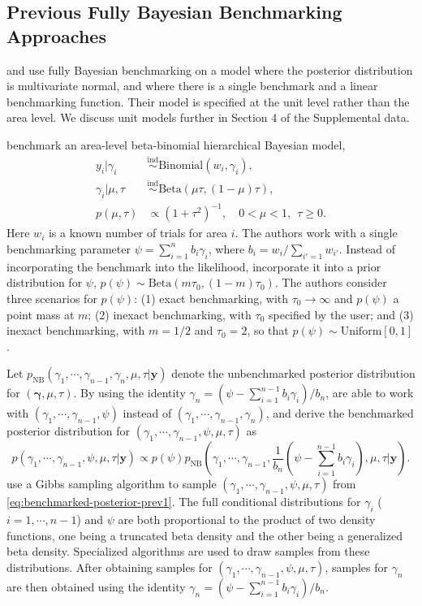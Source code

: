\documentclass[12pt]{article}
\newcommand{\ind}{\stackrel{\text{ind}}{\sim}}
\begin{document}
\subsection{Previous Fully Bayesian Benchmarking Approaches}

\citet{toto2010bayesian} and \citet{nandram2011bayesian} use fully Bayesian benchmarking on a model where the posterior distribution is multivariate normal, and where there is a single benchmark and a linear benchmarking function.  Their model is specified at the unit level rather than the area level.  We discuss unit models further in Section 4 of the Supplemental data.

\citet{nandram2011constraint} benchmark an area-level beta-binomial hierarchical Bayesian model,
\begin{align}
y_i|\gamma_i &\ind \text{Binomial}(w_i,\gamma_i),\\
\gamma_i|\mu,\tau&\ind \text{Beta}(\mu\tau,(1-\mu)\tau),\\
p(\mu,\tau)&\propto (1+\tau^2)^{-1},\quad 0<\mu<1,\ \ \tau\geq 0.
\end{align}
Here $w_i$ is a known number of trials for area $i$.  The authors work with a single benchmarking parameter $\psi=\sum_{i=1}^n b_i\gamma_i$, where $b_i=w_i/\sum_{i'=1}w_{i'}$.  Instead of incorporating the benchmark into the likelihood, \citet{nandram2011constraint} incorporate it into a prior distribution for $\psi$, $p(\psi)\sim \text{Beta}(m\tau_0,(1-m)\tau_0)$.  The authors consider three  scenarios for $p(\psi)$: (1) exact benchmarking, with $\tau_0\rightarrow \infty$ and $p(\psi)$ a point mass at $m$; (2) inexact benchmarking, with $\tau_0$ specified by the user; and
(3) inexact benchmarking, with $m=1/2$ and $\tau_0=2$, so that $p(\psi)\sim \text{Uniform}[0,1]$.

Let $p_{\text{NB}}(\gamma_1,\cdots,\gamma_{n-1},\gamma_n,\mu,\tau|\bm{y})$ denote the unbenchmarked posterior distribution for $(\bm{\gamma},\mu,\tau)$.  By using the identity $\gamma_n=(\psi-\sum_{i=1}^{n-1}b_i\gamma_i)/b_n$, \citet{nandram2011constraint} are able to work with $(\gamma_1,\cdots,\gamma_{n-1},\psi)$ instead of $(\gamma_1,\cdots,\gamma_{n-1},\gamma_n)$, and derive the benchmarked posterior distribution for $(\gamma_1,\cdots,\gamma_{n-1},\psi,\mu,\tau)$ as
\begin{equation}
p(\gamma_1,\cdots,\gamma_{n-1},\psi,\mu,\tau|\bm{y})\propto p(\psi)p_{\text{NB}}\left(\gamma_1,\cdots,\gamma_{n-1},\frac{1}{b_n}\left(\psi-\sum_{i=1}^{n-1}b_i\gamma_i\right),\mu,\tau\Bigg|\bm{y}\right).
\label{eq:benchmarked-posterior-prev1}
\end{equation}
\citet{nandram2011constraint} use a Gibbs sampling algorithm to sample $(\gamma_1,\cdots,\gamma_{n-1},\psi,\mu,\tau)$ from \eqref{eq:benchmarked-posterior-prev1}. The full conditional distributions for $\gamma_i$ ($i=1,\cdots,n-1$) and $\psi$ are both proportional to the product of two density functions, one being a truncated beta density and the other being a generalized beta density. Specialized algorithms are used to draw samples from these distributions.  After obtaining samples for $(\gamma_1,\cdots,\gamma_{n-1},\psi,\mu,\tau)$, samples for $\gamma_n$ are then obtained using the identity $\gamma_n=(\psi-\sum_{i=1}^{n-1}b_i\gamma_i)/b_n$.
\end{document}
